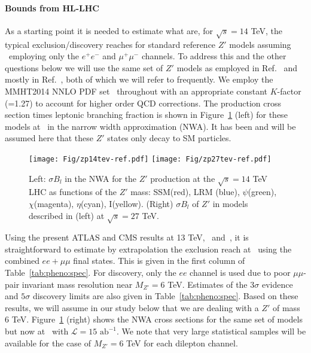 \documentclass[a4paper,11pt]{article}
\newcommand*{\intlumihelhc}{\ensuremath{\mathcal{L}=15\text{ ab}^{-1}}}
\begin{document}
\paragraph*{Bounds from HL-LHC}
As a starting point it is needed to estimate what are, for $\sqrt s=14$ TeV, the typical exclusion/discovery reaches for standard reference $Z'$ models assuming \intlumihllhc\ employing only the $e^+e^-$ and $\mu^+\mu^-$ channels. To address this and the other questions below we will use the same set of $Z'$ models as employed
in Ref.~\cite{Rizzo:2014xma} and mostly in Ref.~\cite{Han:2013mra}, both of which we will refer to frequently. We employ the MMHT2014 NNLO PDF set~\cite{Harland-Lang:2014zoa}
throughout with an appropriate constant $K$-factor (=1.27) to account for higher order QCD corrections. The production cross section times leptonic branching fraction is shown in Figure~\ref{fig:pheno:toy} (left) for these models at \sqrtslhc\ in the narrow width approximation (NWA). It has been and will be assumed here that these $Z'$ states only decay to SM particles.


\begin{figure}[htbp]
  \centering
    \texttt{[image: Fig/zp14tev-ref.pdf]}
    \texttt{[image: Fig/zp27tev-ref.pdf]}
    \caption{Left: $\sigma B_l$ in the NWA for the $Z'$ production at the $\sqrt s=14$ TeV LHC as functions of the $Z'$ mass: SSM(red), LRM (blue), $\psi$(green), $\chi$(magenta),
$\eta$(cyan), I(yellow). (Right) $\sigma B_l$ of $Z'$ in models described in (left) at $\sqrt s=27$ TeV.}
\label{fig:pheno:toy}
\end{figure}

Using the present ATLAS and CMS results at 13 TeV,~\cite{Aaboud:2017buh} and~\cite{Sirunyan:2018exx}, it is straightforward to estimate by extrapolation the
exclusion reach at \sqrtslhc\ using the combined $ee+\mu\mu$ final states. This is given in the first column of Table~\ref{tab:pheno:spec}. For discovery, only the $ee$ channel is used due to poor $\mu\mu$-pair invariant mass resolution near $M_{Z'}=6$ TeV. Estimates of the $3\sigma$ evidence and $5\sigma$
discovery limits are also given in Table~\ref{tab:pheno:spec}. Based on these results, we will assume in our study below that we are dealing with a $Z'$ of mass 6 TeV. Figure~\ref{fig:pheno:toy} (right) shows the NWA cross sections for the same set of models but now at \sqrtshelhc\ with \intlumihelhc. We note that very large statistical samples will be available for the case of $M_{Z'}=6$ TeV
for each dilepton channel.
\end{document}
